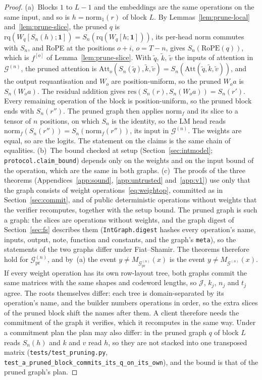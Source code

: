\begin{proof}
(a)~Blocks $1$ to $L-1$ and the embeddings are the same operations on the same input, and so is
$h=\mathrm{norm}_1(r)$ of block $L$. By Lemmas~\ref{lem:prune-local} and~\ref{lem:prune-slice},
the pruned $q$ is $\mathrm{rq}(W_q[S_n(h);\mathbf 1])=S_n(\mathrm{rq}(W_q[h;\mathbf 1]))$, its
per-head norm commutes with $S_n$, and RoPE at the positions $o+i$, $o=T-n$, gives
$S_n(\mathrm{RoPE}(q))$, which is $f^{[o]}$ of Lemma~\ref{lem:prune-slice}. With $\tilde q$,
$\tilde k$, $\tilde v$ the inputs of attention in $\mathcal G^{(n)}$, the pruned attention is
$\mathrm{Att}_o(S_n(\tilde q),\tilde k,\tilde v)=S_n(\mathrm{Att}(\tilde q,\tilde k,\tilde v))$, and
the output requantisation and $W_o$ are position-uniform, so the pruned $W_oa$ is $S_n(W_oa)$. The
residual addition gives $\mathrm{res}(S_n(r),S_n(W_oa))=S_n(r')$. Every remaining operation of the
block is position-uniform, so the pruned block ends with $S_n(r'')$. The pruned graph then applies
$\mathrm{norm}_f$ and its slice to a tensor of $n$ positions, on which $S_n$ is the identity, so the
LM head reads $\mathrm{norm}_f(S_n(r''))=S_n(\mathrm{norm}_f(r''))$, its input in
$\mathcal G^{(n)}$. The weights are equal, so are the logits. The statement on the claims is the
same chain of equalities.
(b)~The bound checked at setup (Section~\ref{sec:intmodel}; \texttt{protocol.claim\_bound})
depends only on the weights and on the input bound of the operation, which are the same in both
graphs.
(c)~The proofs of the three theorems (Appendices~\ref{app:sound}, \ref{app:untrusted}
and~\ref{app:v1}) use only that the graph consists of weight operations~\eqref{eq:weightop},
committed as in Section~\ref{sec:commit}, and of public deterministic operations without weights
that the verifier recomputes, together with the setup bound. The pruned graph is such a graph: the
slices are operations without weights, and the graph digest of Section~\ref{sec:fs} describes them
(\texttt{IntGraph.digest} hashes every operation's name, inputs, output, note, function and
constants, and the graph's \texttt{meta}), so the statements of the two graphs differ under
Fiat--Shamir. The theorems therefore hold for $\mathcal G^{(n)}_{\mathrm{pr}}$, and by~(a) the event
$y\neq M_{\mathcal G^{(n)}_{\mathrm{pr}}}(x)$ is the event $y\neq M_{\mathcal G^{(n)}}(x)$. If every
weight operation has its own row-layout tree, both graphs commit the same matrices with the same
shapes and codeword lengths, so $\mathcal J$, $k_j$, $n_j$ and $t_j$ agree. The roots themselves
differ: each tree is domain-separated by its operation's name, and the builder numbers operations in
order, so the extra slices of the pruned block shift the names after them. A client therefore needs
the commitment of the graph it verifies, which it recomputes in the same way. Under a commitment
plan the plan may also differ: in the pruned graph $q$ of block $L$ reads $S_n(h)$ and $k$ and $v$
read $h$, so they are not stacked into one transposed matrix (\texttt{tests/test\_pruning.py},
\texttt{test\_a\_pruned\_block\_commits\_its\_q\_on\_its\_own}), and the bound is that of the pruned
graph's plan.
\end{proof}

